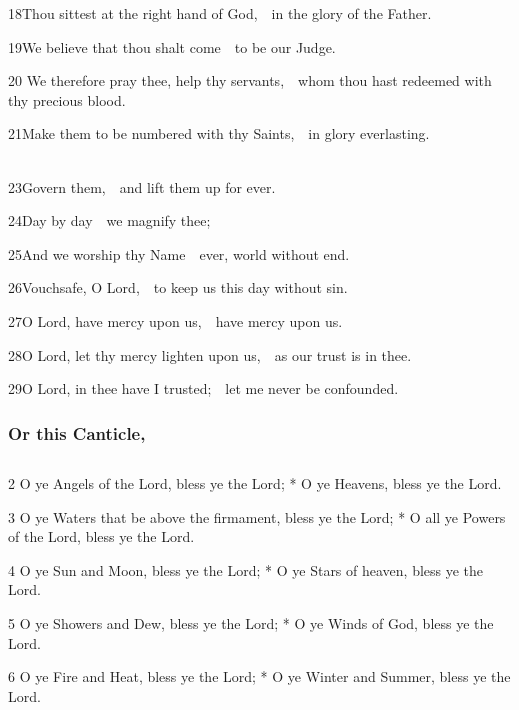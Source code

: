 18\enspace Thou sittest at the right hand of God,\ \star\ in the glory of the Father.

19\enspace We believe that thou shalt come\ \star\ to be our Judge.

20 We therefore pray thee, help thy servants,\ \star\ whom thou hast redeemed with thy precious blood.

21\enspace Make them to be numbered with thy Saints,\ \star\ in glory everlasting.


\\
23\enspace Govern them,\ \star\ and lift them up for ever.

24\enspace Day by day\ \star\ we magnify thee;

25\enspace And we worship thy Name\ \star\ ever, world without end.

26\enspace Vouchsafe, O Lord,\ \star\ to keep us this day without sin.

27\enspace O Lord, have mercy upon us,\ \star\ have mercy upon us.

28\enspace O Lord, let thy mercy lighten upon us,\ \star\ as our trust is in thee.

29\enspace O Lord, in thee have I trusted;\ \star\ let me never be confounded.

\subsubsection{Or this Canticle,}

\subsection{}


2 O ye Angels of the Lord, bless ye the Lord; * O ye Heavens, bless ye the Lord.

3 O ye Waters that be above the firmament, bless ye the Lord; * O all ye Powers of the Lord, bless ye the Lord.

4 O ye Sun and Moon, bless ye the Lord; * O ye Stars of heaven, bless ye the Lord.

5 O ye Showers and Dew, bless ye the Lord; * O ye Winds of God, bless ye the Lord.

6 O ye Fire and Heat, bless ye the Lord; * O ye Winter and Summer, bless ye the Lord.

